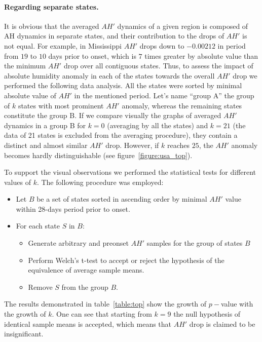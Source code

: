 \documentclass[procedia]{easychair}
\begin{document}
\paragraph{Regarding separate states.}

It is obvious that the averaged $AH'$ dynamics of a given region is composed of AH dynamics in separate states, and their contribution to the drops of $AH'$ is not equal. For example, in Mississippi $AH'$ drops down to $-0.00212$ in period from $19$ to $10$ days prior to onset, which is $7$ times greater by absolute value than the minimum $AH'$ drop over all contiguous states. Thus, to assess the impact of absolute humidity anomaly in each of the states towards the overall $AH'$ drop we performed the following data analysis. All the states were sorted by minimal absolute value of $AH'$ in the mentioned period. Let's name ``group A'' the group of $k$ states with most prominent $AH'$ anomaly, whereas the remaining states constitute the group B. If we compare visually the graphs of averaged $AH'$ dynamics in a group B for $k=0$ (averaging by all the states) and $k = 21$ (the data of 21 states is excluded from the averaging procedure), they contain a distinct and almost similar $AH'$ drop. However, if $k$ reaches $25$, the $AH'$ anomaly becomes hardly distinguishable (see figure~\ref{figure:usa_top}).



To support the visual observations we performed the statistical tests for different values of $k$. The following procedure was employed:
\begin{itemize}
	\item Let $B$ be a set of states sorted in ascending order by minimal $AH'$ value within 28-days period prior to onset. 
	\item For each state $S$ in $B$:
	\begin{itemize}		
		\item Generate arbitrary and preonset $AH'$ samples
			for the group of states $B$
		\item Perform  Welch's t-test to accept or reject the hypothesis of the equivalence of average sample means.
		\item Remove $S$ from the group $B$.
	\end{itemize}
\end{itemize}

The results demonstrated in table~\ref{table:top} show the growth of $p-$value with the growth of $k$. One can see that starting from $k = 9$ the null hypothesis of identical sample means is accepted, which means that $AH'$ drop is claimed to be insignificant.
\end{document}
